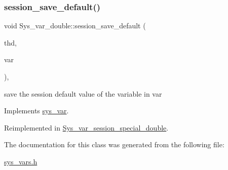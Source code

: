 \subsubsection{\texorpdfstring{session\+\_\+save\+\_\+default()}{session\_save\_default()}}
{\footnotesize\ttfamily void Sys\+\_\+var\+\_\+double\+::session\+\_\+save\+\_\+default (\begin{DoxyParamCaption}\item[{T\+HD $\ast$}]{thd,  }\item[{\mbox{\hyperlink{classset__var}{set\+\_\+var}} $\ast$}]{var }\end{DoxyParamCaption})\hspace{0.3cm}{\ttfamily [inline]}, {\ttfamily [virtual]}}

save the session default value of the variable in var 

Implements \mbox{\hyperlink{classsys__var}{sys\+\_\+var}}.



Reimplemented in \mbox{\hyperlink{classSys__var__session__special__double_ae1b1d7ae1d78d24bf79e90477f6ee703}{Sys\+\_\+var\+\_\+session\+\_\+special\+\_\+double}}.



The documentation for this class was generated from the following file\+:\begin{DoxyCompactItemize}
\item 
\mbox{\hyperlink{sys__vars_8h}{sys\+\_\+vars.\+h}}\end{DoxyCompactItemize}
